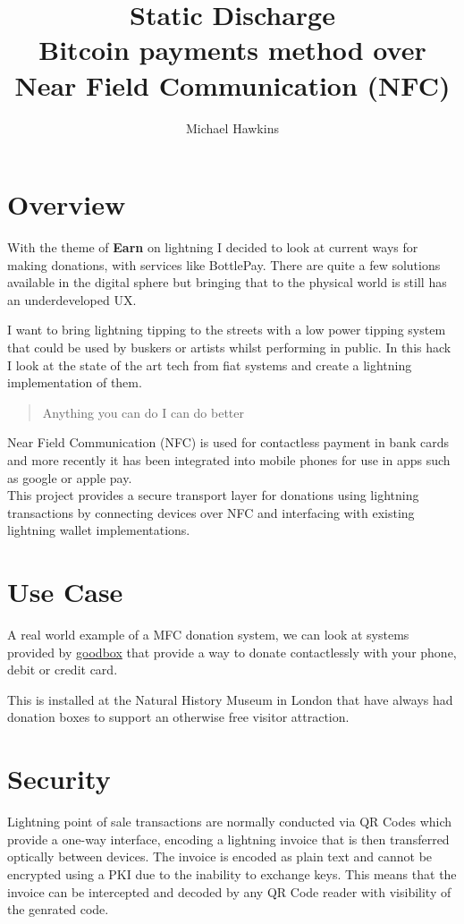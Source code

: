 \documentclass[a4paper]{article}
\begin{document}
\author{Michael Hawkins}
\title{%
	Static Discharge\\
	\large Bitcoin payments method over\\
	Near Field Communication (NFC)}

\maketitle

\section{Overview}
With the theme of \textbf{Earn} on lightning I decided to look at current ways
for making donations, with services like BottlePay.  There are quite a few
solutions available in the digital sphere but bringing that to the physical
world is still has an underdeveloped UX.

I want to bring lightning tipping to the streets with a low power tipping system
that could be used by buskers or artists whilst performing in public.  In this
hack I look at the state of the art tech from fiat systems and create a lightning
implementation of them.

\begin{quote}
Anything you can do I can do better
\end{quote}

Near Field Communication (NFC) is used for contactless payment in bank cards and
more recently it has been integrated into mobile phones for use in apps such as
google or apple pay.\\

This project provides a secure transport layer for donations using lightning
transactions by connecting devices over NFC and interfacing with existing
lightning wallet implementations.

\section{Use Case}
A real world example of a MFC donation system, we can look at systems provided
by \href{https://www.goodbox.com/2018/10/natural-history-museum/}{goodbox} that
provide a way to donate contactlessly with your phone, debit or credit card.

This is installed at the Natural History Museum in London that have always had
donation boxes to support an otherwise free visitor attraction.

\section{Security}
Lightning point of sale transactions are normally conducted via QR Codes which
provide a one-way interface, encoding a lightning invoice that is then
transferred optically between devices.  The invoice is encoded as plain text
and cannot be encrypted using a PKI due to the inability to exchange keys.  This
means that the invoice can be intercepted and decoded by any QR Code reader with
visibility of the genrated code.\\
\end{document}
